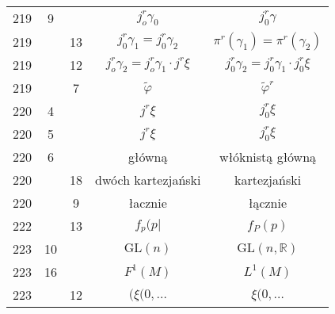 \documentclass[a4paper,11pt]{article}
\newcommand{\mb}{\mathbb}
\newcommand{\mr}{\mathrm}
\newcommand{\ld}{\ldots}
\newcommand{\GL}{\mr{GL}}
\newcommand{\ga}{\gamma}
\newcommand{\vp}{\varphi}
\newcommand{\R}{\mb{R}}
\newcommand{\wt}{\widetilde}
\begin{document}
\begin{center}
\begin{tabular}{|c|c|c|c|c|}
    219 &  9 & & $j_{ o }^{ r } \ga_{ 0 }$ & $j_{ 0 }^{ r } \ga$ \\
    219 & & 13 & $j_{ 0 }^{ r } \ga_{ 1 } = j_{ 0 }^{ r } \ga_{ 2 }$
           & $\pi^{ r } ( \ga_{ 1 } ) = \pi^{ r }( \ga_{ 2 } )$ \\
    219 & & 12 & $j^{ r }_{ o } \ga_{ 2 } = j^{ r }_{ o } \ga_{ 1 }
                 \cdot j^{ r } \xi$
           & $j^{ r }_{ 0 } \ga_{ 2 } = j^{ r }_{ 0 } \ga_{ 1 } \cdot
             j^{ r }_{ 0 } \xi$ \\
    219 & & 7 & $\wt{ \vp }$ & $\wt{ \vp }^{ r }$ \\
    220 & 4 & & $j^{ r } \xi$ & $j^{ r }_{ 0 } \xi$ \\
    220 & 5 & & $j^{ r } \xi$ & $j^{ r }_{ 0 } \xi$ \\
    220 & 6 & & główną & włóknistą główną \\
    220 & & 18 & dwóch kartezjański & kartezjański \\
    220 & &  9 & łacznie & łącznie \\
    222 & & 13 & $f_{ p }( p |$ & $f_{ P }( p )$ \\
    223 & 10 & & $\GL( n )$ & $\GL( n ,\R )$ \\
    223 & 16 & & $F^{ 1 }( M )$ & $L^{ 1 }( M )$ \\
    223 & & 12 & $( \xi( 0, \ld$ & $\xi( 0, \ld$ \\ \hline
  \end{tabular}


\end{center}
\end{document}
